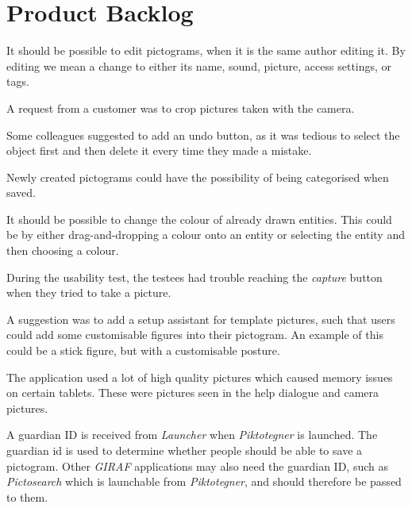 \chapter{Product Backlog}\label{app:further-deflopment}
\begin{description}[style=nextline]
\item[Editing pictograms]
It should be possible to edit pictograms, when it is the same author editing it. 
By editing we mean a change to either its name, sound, picture, access settings, or tags.

\item[Crop camera pictures]
A request from a customer was to crop pictures taken with the camera.

\item[Undo button]
Some colleagues suggested to add an undo button, as it was tedious to select the object first and then delete it every time they made a mistake.

\item[Categorising pictograms]
Newly created pictograms could have the possibility of being categorised when saved.

\item[Change colour of drawn entities]
It should be possible to change the colour of already drawn entities.
This could be by either drag-and-dropping a colour onto an entity or selecting the entity and then choosing a colour.

\item[Camera fragment buttons]
During the usability test, the testees had trouble reaching the \textit{capture} button when they tried to take a picture.

\item[Template pictures]
A suggestion was to add a setup assistant for template pictures, such that users could add some customisable figures into their pictogram.
An example of this could be a stick figure, but with a customisable posture. 

\item[Memory issues]
The application used a lot of high quality pictures which caused memory issues on certain tablets. 
These were pictures seen in the help dialogue and camera pictures.

\item[Send the guardian id to \textit{Pictosearch}]
A guardian ID is received from \textit{Launcher} when \textit{Piktotegner} is launched.
The guardian id is used to determine whether people should be able to save a pictogram.
Other \textit{GIRAF} applications may also need the guardian ID, such as \textit{Pictosearch} which is launchable from \textit{Piktotegner}, and should therefore be passed to them.


\end{description}
